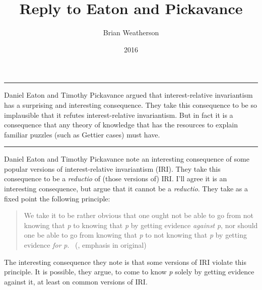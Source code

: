 \documentclass[
  10pt,
  letterpaper,
  DIV=11,
  numbers=noendperiod,
  twoside]{scrartcl}
\title{Reply to Eaton and Pickavance}
\author{Brian Weatherson}
\date{2016}
\renewenvironment{abstract}
 {\vspace{-1.25cm}
 \quotation\small\noindent\rule{\linewidth}{.5pt}\par\smallskip
 \noindent }
 {\par\noindent\rule{\linewidth}{.5pt}\endquotation}
\begin{document}
\maketitle
\begin{abstract}
Daniel Eaton and Timothy Pickavance argued that interest-relative
invariantism has a surprising and interesting consequence. They take
this consequence to be so implausible that it refutes interest-relative
invariantism. But in fact it is a consequence that any theory of
knowledge that has the resources to explain familiar puzzles (such as
Gettier cases) must have.
\end{abstract}


Daniel Eaton and Timothy Pickavance note an interesting consequence of
some popular versions of interest-relative invariantism (IRI). They take
this consequence to be a \emph{reductio} of (those versions of) IRI.
I'll agree it is an interesting consequence, but argue that it cannot be
a \emph{reductio}. They take as a fixed point the following principle:

\begin{quote}
We take it to be rather obvious that one ought not be able to go from
not knowing that \emph{p} to knowing that \emph{p} by getting evidence
\emph{against} \emph{p}, nor should one be able to go from knowing that
\emph{p} to not knowing that \emph{p} by getting evidence \emph{for}
\emph{p}. ~(, emphasis in original)
\end{quote}

The interesting consequence they note is that some versions of IRI
violate this principle. It is possible, they argue, to come to know
\emph{p} solely by getting evidence against it, at least on common
versions of IRI.
\end{document}
